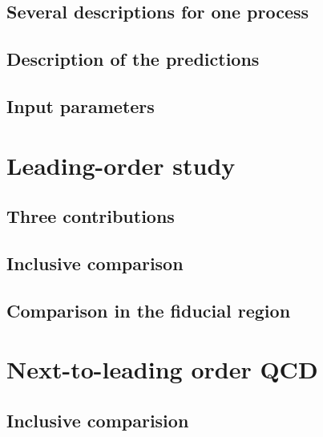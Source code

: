 \documentclass[11pt,epsf]{article}
\begin{document}
\subsection{Several descriptions for one process}



\subsection{Description of the predictions}



\subsection{Input parameters}



\section{Leading-order study}
\label{sec:LO}

\subsection{Three contributions}



\subsection{Inclusive comparison}



\subsection{Comparison in the fiducial region}





\section{Next-to-leading order QCD}
\label{sec:NLO}

\subsection{Inclusive comparision}
\end{document}
